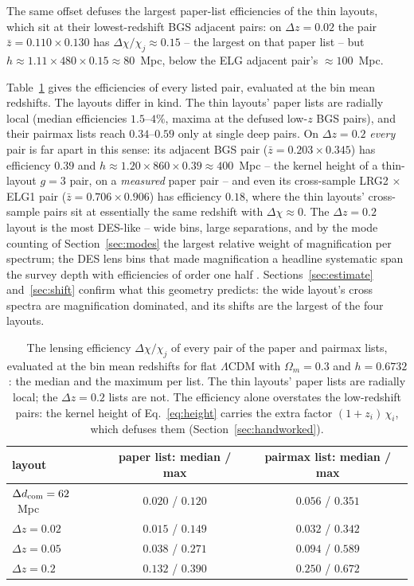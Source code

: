 \documentclass[11pt]{article}
\newcommand{\dcom}{$\Delta d_{\rm com} = 62$~Mpc}
\begin{document}
The same offset defuses the largest paper-list efficiencies of the
thin layouts, which sit at their lowest-redshift BGS adjacent pairs:
on $\Delta z = 0.02$ the pair $\bar z = 0.110 \times 0.130$ has
$\Delta\chi/\chi_j \approx 0.15$ -- the largest on that paper list --
but $h \approx 1.11 \times 480 \times 0.15 \approx 80$~Mpc, below the
ELG adjacent pair's $\approx 100$~Mpc.

Table~\ref{tab:efficiency} gives the efficiencies of every listed
pair, evaluated at the bin mean redshifts.  The layouts differ in
kind.  The thin layouts' paper lists are radially local (median
efficiencies $1.5$--$4\%$, maxima at the defused low-$z$ BGS pairs),
and their pairmax lists reach $0.34$--$0.59$ only at single deep
pairs.  On $\Delta z = 0.2$ \emph{every} pair is far apart in this
sense: its adjacent BGS pair ($\bar z = 0.203 \times 0.345$) has
efficiency $0.39$ and $h \approx 1.20 \times 860 \times 0.39 \approx
400$~Mpc -- the kernel height of a thin-layout $g = 3$ pair, on a
\emph{measured} paper pair -- and even its cross-sample
LRG2$\,\times\,$ELG1 pair ($\bar z = 0.706 \times 0.906$) has
efficiency $0.18$, where the thin layouts' cross-sample pairs sit at
essentially the same redshift with $\Delta\chi \approx 0$.  The
$\Delta z = 0.2$ layout is the most DES-like -- wide bins, large
separations, and by the mode counting of Section~\ref{sec:modes} the
largest relative weight of magnification per spectrum; the DES lens
bins that made magnification a headline systematic span the survey
depth with efficiencies of order one half \cite{ElvinPoole2022}.
Sections~\ref{sec:estimate} and~\ref{sec:shift} confirm what this
geometry predicts: the wide layout's cross spectra are magnification
dominated, and its shifts are the largest of the four layouts.

\begin{table}[tbp]
  \centering
  \begin{tabular}{lcc}
    \toprule
    layout & paper list: median / max & pairmax list: median / max \\
    \midrule
    \dcom{}           & $0.020$ / $0.120$ & $0.056$ / $0.351$ \\
    $\Delta z = 0.02$ & $0.015$ / $0.149$ & $0.032$ / $0.342$ \\
    $\Delta z = 0.05$ & $0.038$ / $0.271$ & $0.094$ / $0.589$ \\
    $\Delta z = 0.2$  & $0.132$ / $0.390$ & $0.250$ / $0.672$ \\
    \bottomrule
  \end{tabular}
  \caption{The lensing efficiency $\Delta\chi/\chi_j$ of every pair
    of the paper and pairmax lists, evaluated at the bin mean
    redshifts for flat $\Lambda$CDM with $\Omega_m = 0.3$ and
    $h = 0.6732$: the median and the maximum per list.  The thin
    layouts' paper lists are radially local; the $\Delta z = 0.2$
    lists are not.  The efficiency alone overstates the low-redshift
    pairs: the kernel height of Eq.~\eqref{eq:height} carries the
    extra factor $(1 + z_i)\,\chi_i$, which defuses them
    (Section~\ref{sec:handworked}).}
  \label{tab:efficiency}
\end{table}
\end{document}
